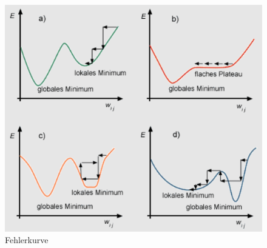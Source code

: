 \begin{figure}[H]
    \centering
    \includegraphics[scale=1]{pics/ai/fehlerkurve.png}
    \caption{Fehlerkurve \cite{tech:fehlerkurve:cite}}
    \label{fig:tech:Fehler}
\end{figure}

